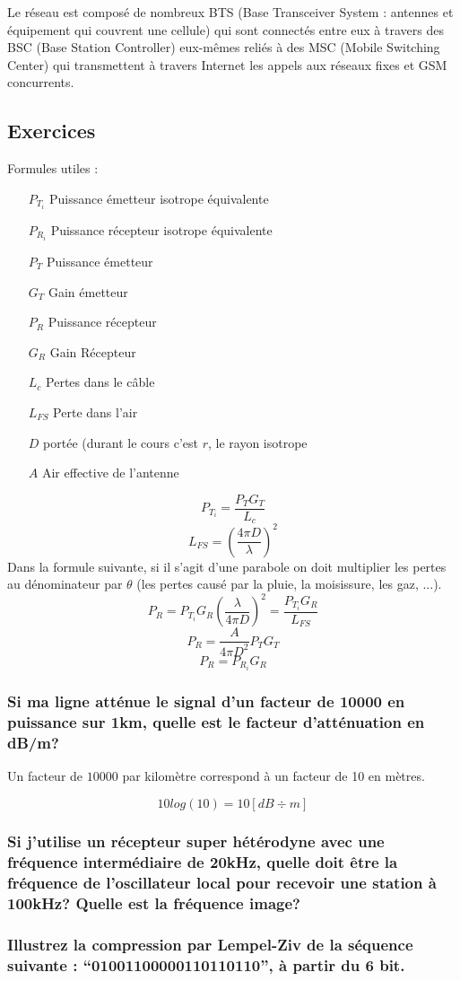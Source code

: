 Le réseau est composé de nombreux BTS (Base Transceiver System : antennes et équipement qui couvrent une cellule) qui sont connectés entre eux à travers des BSC (Base Station Controller) eux-mêmes reliés à des MSC (Mobile Switching Center) qui transmettent à travers Internet les appels aux réseaux fixes et GSM concurrents.

\subsection{Exercices}

Formules utiles :

\begin{itemize}
\item[$P_{T_i}$] Puissance émetteur isotrope équivalente
\item[$P_{R_i}$] Puissance récepteur isotrope équivalente
\item[$P_T$] Puissance émetteur
\item[$G_T$] Gain émetteur
\item[$P_R$] Puissance récepteur
\item[$G_R$] Gain Récepteur
\item[$L_c$] Pertes dans le c\^able
\item[$L_{FS}$] Perte dans l'air
\item[$D$] portée (durant le cours c'est $r$, le rayon isotrope
\item[$A$] Air effective de l'antenne
\end{itemize}

$$P_{T_i} = \frac{P_TG_T}{L_c}$$
$$L_{FS} = \left(\frac{4\pi D}{\lambda}\right)^2$$
Dans la formule suivante, si il s'agit d'une parabole on doit multiplier les pertes au dénominateur par $\theta$ (les pertes causé par la pluie, la moisissure, les gaz, ...).
$$P_R = P_{T_i}G_R \left(\frac{\lambda}{4\pi D}\right)^2=\frac{P_{T_i}G_R}{L_{FS}}$$
$$P_R = \frac{A}{4\pi D^2}P_TG_T$$
$$P_R = P_{R_i}G_R$$

\subsubsection*{Si ma ligne atténue le signal d'un facteur de 10000 en puissance sur 1km, quelle est le facteur d'atténuation en dB/m? } 

Un facteur de $10000$ par kilomètre correspond à un facteur de 10 en mètres.

\[ 10log(10) = 10[dB\div m] \]

\subsubsection*{Si j'utilise un récepteur super hétérodyne avec une fréquence intermédiaire de 20kHz, quelle doit être la fréquence de l'oscillateur local pour recevoir une station à 100kHz? Quelle est la fréquence image?}



\subsubsection*{Illustrez la compression par Lempel-Ziv de la séquence suivante : ``01001100000110110110'', à partir du 6 bit.}
